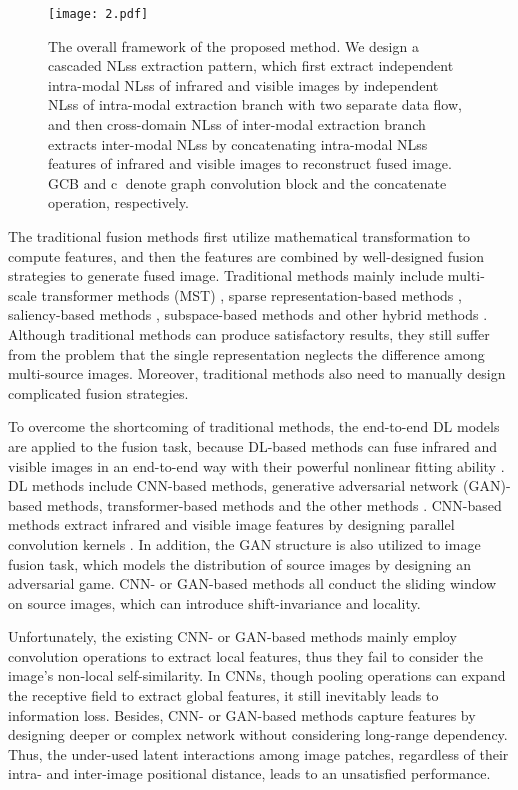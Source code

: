 \documentclass[journal]{IEEEtran}
\begin{document}
\begin{figure*}[!h]
\centering
\texttt{[image: 2.pdf]}
\caption{The overall framework of the proposed method. We design a cascaded NLss extraction pattern, which first extract independent intra-modal NLss of infrared and visible images by independent NLss of intra-modal extraction branch with two separate data flow, and then cross-domain NLss of inter-modal extraction branch extracts inter-modal NLss by concatenating intra-modal NLss features of infrared and visible images to reconstruct fused image. GCB and \textcircled{c} denote graph convolution block and the concatenate operation, respectively.}
\label{FIG:2}
\end{figure*}

The traditional fusion methods first utilize mathematical transformation to compute features, and then the features are combined by well-designed fusion strategies to generate fused image. Traditional methods mainly include multi-scale transformer methods (MST) \cite{shreyamsha2015image,burt1987laplacian}, sparse representation-based methods \cite{zhang2018sparse}, saliency-based methods \cite{bavirisetti2016two}, subspace-based methods \cite{mitianoudis2007pixel} and other hybrid methods \cite{liu2015general}. Although traditional methods can produce satisfactory results, they still suffer from the problem that the single representation neglects the difference among multi-source images. Moreover, traditional methods also need to manually design complicated fusion strategies.

To overcome the shortcoming of traditional methods, the end-to-end DL models are applied to the fusion task, because DL-based methods can fuse infrared and visible images in an end-to-end way with their powerful nonlinear fitting ability \cite{liu2018deep}. DL methods include CNN-based methods, generative adversarial network (GAN)-based methods, transformer-based methods \cite{xu2022infrared} and the other methods \cite{yue2023dif, ren2021infrared}. CNN-based methods extract infrared and visible image features by designing parallel convolution kernels \cite{tian2021depth}. In addition, the GAN structure is also utilized to image fusion task, which models the distribution of source images by designing an adversarial game. CNN- or GAN-based methods all conduct the sliding window on source images, which can introduce shift-invariance and locality.

Unfortunately, the existing CNN- or GAN-based methods mainly employ convolution operations to extract local features, thus they fail to consider the image's non-local self-similarity. In CNNs, though pooling operations can expand the receptive field to extract global features, it still inevitably leads to information loss. Besides, CNN- or GAN-based methods capture features by designing deeper or complex network without considering long-range dependency. Thus, the under-used latent interactions among image patches, regardless of their intra- and inter-image positional distance, leads to an unsatisfied performance.
\end{document}
